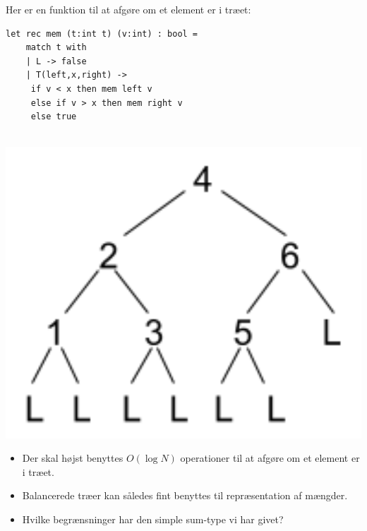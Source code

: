 \documentclass[rgb]{beamer}
\begin{document}
\begin{frame}[fragile]
\begin{footnotesize}

  \vspace{1ex}

  \vspace{1ex}

\begin{minipage}[b]{0.7\textwidth}

  Her er en funktion til at afgøre om et element er i træet:
  \vspace{1ex}
\begin{lstlisting}[numbers=none,frame=none,mathescape]
  let rec mem (t:int t) (v:int) : bool =
    match t with
    | L -> false
    | T(left,x,right) ->
     if v < x then mem left v
     else if v > x then mem right v
     else true
\end{lstlisting}
\end{minipage}
\begin{minipage}[b]{0.25\textwidth}

  ~\hspace{-5mm}\includegraphics[width=1.2\textwidth]{../images/tree123456.png}

\end{minipage}

  \vspace{1ex}
  \vspace{1ex}
  \begin{itemize}
  \item Der skal højst benyttes $O(\log N)$ operationer til at afgøre om et element er i træet.
  \item Balancerede træer kan således fint benyttes til repræsentation af mængder.
  \item Hvilke begrænsninger har den simple sum-type vi har givet?
  \end{itemize}

\end{footnotesize}
\end{frame}
\end{document}
